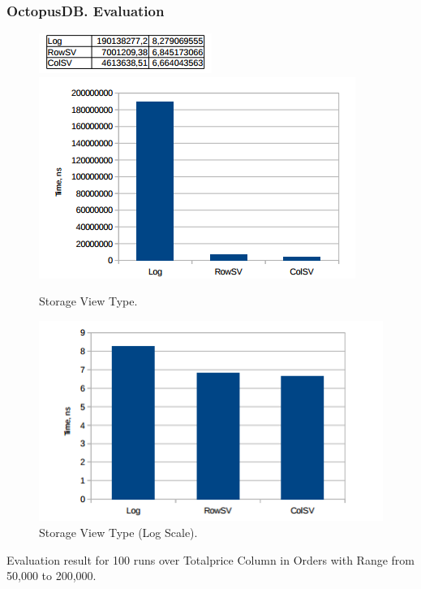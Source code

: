 \documentclass{beamer}
\begin{document}
\begin{frame}
\frametitle{OctopusDB. Evaluation}
\begin{figure}
\centering
\begin{minipage}{.5\textwidth}
  \centering
  \includegraphics[scale=0.6]{img/Blinktopus-Evaluations3.png}
\end{minipage}
\begin{minipage}{.5\textwidth}
  \centering
  \includegraphics[scale=0.5]{img/Blinktopus-Evaluations1.png}
  \caption{\fontsize{6}{5}\selectfont Storage View Type.}
\end{minipage}%
\begin{minipage}{.5\textwidth}
  \centering
  \includegraphics[scale=0.5]{img/Blinktopus-Evaluations2.png}
  \caption{\fontsize{6}{5}\selectfont Storage View Type (Log Scale).}
\end{minipage}
\end{figure}
\fontsize{10}{5}\selectfont Evaluation result for 100 runs over Totalprice Column in Orders with Range from 50,000 to 200,000.
\end{frame}
\end{document}
